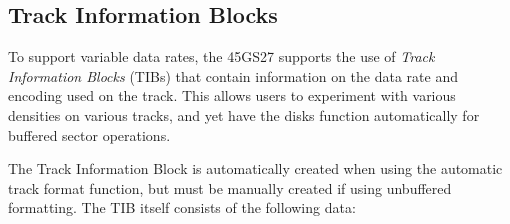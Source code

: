 \subsection{Track Information Blocks}

To support variable data rates, the 45GS27 supports the use of
{\em Track Information Blocks} (TIBs) that contain information on the
data rate and encoding used on the track. This allows users to experiment with various densities on various tracks,
and yet have the disks function automatically for buffered sector operations.

The Track Information Block is automatically created when using the automatic track format function, but must be
manually created if using unbuffered formatting. The TIB itself consists of the following data:


